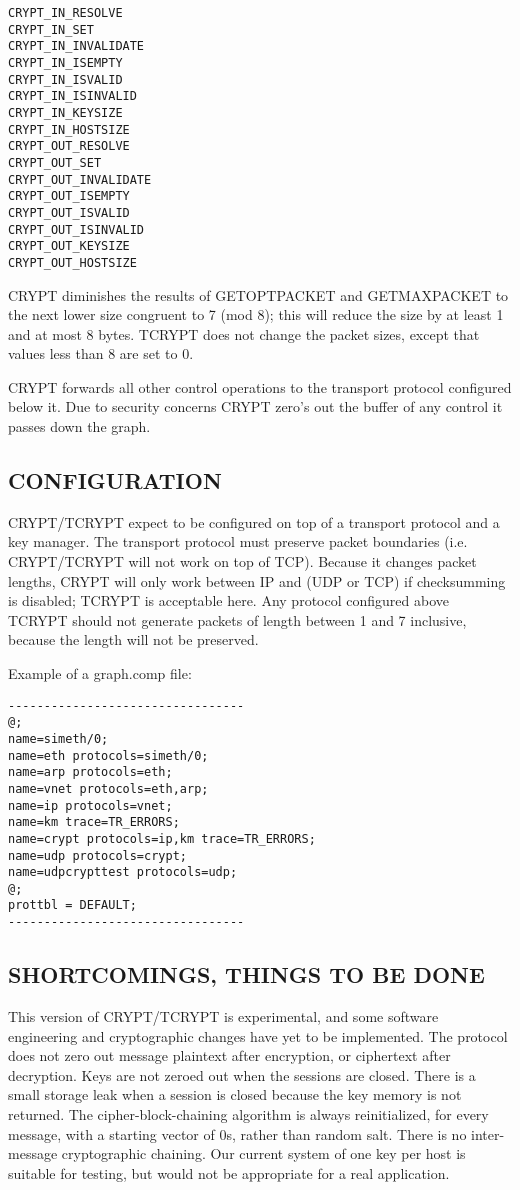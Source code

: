 \begin{verbatim}
CRYPT_IN_RESOLVE       
CRYPT_IN_SET          
CRYPT_IN_INVALIDATE   
CRYPT_IN_ISEMPTY      
CRYPT_IN_ISVALID      
CRYPT_IN_ISINVALID    
CRYPT_IN_KEYSIZE      
CRYPT_IN_HOSTSIZE     
CRYPT_OUT_RESOLVE       
CRYPT_OUT_SET          
CRYPT_OUT_INVALIDATE   
CRYPT_OUT_ISEMPTY      
CRYPT_OUT_ISVALID      
CRYPT_OUT_ISINVALID    
CRYPT_OUT_KEYSIZE      
CRYPT_OUT_HOSTSIZE     
\end{verbatim}


CRYPT diminishes the results of GETOPTPACKET 
and GETMAXPACKET to the next lower size congruent to 7 (mod 8);
this will reduce the size by at least 1 and at most 8 bytes.
TCRYPT does not change the packet sizes, except that values less than 8
are set to 0. 

CRYPT forwards all other control operations to the transport protocol 
configured below it. Due to security concerns CRYPT zero's out the 
buffer of any control it passes down the graph.  

\subsection*{CONFIGURATION}

CRYPT/TCRYPT expect to be configured on top of a transport protocol and a
key manager. The transport protocol must preserve packet boundaries
(i.e. CRYPT/TCRYPT will not work on top of TCP).
Because it changes packet lengths, CRYPT will only work between
IP and (UDP or TCP) if checksumming is disabled; TCRYPT is acceptable here.
Any protocol configured above TCRYPT should not generate
packets of length between 1 and 7 inclusive, because the length will
not be preserved.

Example of a graph.comp file:
\begin{verbatim}
---------------------------------
@;
name=simeth/0;
name=eth protocols=simeth/0;
name=arp protocols=eth;
name=vnet protocols=eth,arp;
name=ip protocols=vnet;
name=km trace=TR_ERRORS;
name=crypt protocols=ip,km trace=TR_ERRORS;
name=udp protocols=crypt;
name=udpcrypttest protocols=udp;
@;
prottbl = DEFAULT;
---------------------------------
\end{verbatim}

\subsection*{SHORTCOMINGS, THINGS TO BE DONE}

This version of CRYPT/TCRYPT is experimental, and some software
engineering and cryptographic changes have yet to be implemented.  The
protocol does not zero out message plaintext after encryption, or
ciphertext after decryption.  Keys are not zeroed out when the
sessions are closed.  There is a small storage leak when a session is
closed because the key memory is not returned.  The
cipher-block-chaining algorithm is always reinitialized, for every
message, with a starting vector of 0s, rather than random salt.  There
is no inter-message cryptographic chaining.  Our current system of one
key per host is suitable for testing, but would not be appropriate for
a real application.

